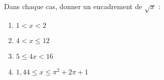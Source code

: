 
Dans chaque cas, donner un encadrement de $\sqrt{x}$ :

  \begin{enumerate}
  \item $1 < x <2$
  \item $4 < x \leq 12$
  \item $5 \leq 4x < 16$
  \item $1,44 \leq x \leq \pi^2 + 2\pi +1$
  \end{enumerate}


